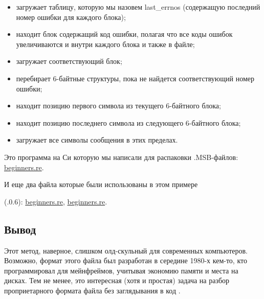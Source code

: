 \begin{itemize}
\item загружает таблицу, которую мы назовем last\_errnos 
(содержащую последний номер ошибки для каждого блока);

\item находит блок содержащий код ошибки, полагая что все коды ошибок увеличиваются и внутри каждого блока
и также в файле;

\item загружает соответствующий блок;

\item перебирает 6-байтные структуры, пока не найдется соответствующий номер ошибки;

\item находит позицию первого символа из текущего 6-байтного блока;

\item находит позицию последнего символа из следующего 6-байтного блока;

\item загружает все символы сообщения в этих пределах.
\end{itemize}

Это программа на Си которую мы написали для распаковки .MSB-файлов:
\href{http://beginners.re/examples/oracle/MSB/oracle_msb.c}{beginners.re}.

И еще два файла которые были использованы в этом примере
 
(.0.6):
\href{http://beginners.re/examples/oracle/MSB/oraus.msb}{beginners.re},
\href{http://beginners.re/examples/oracle/MSB/oraus.msg}{beginners.re}.

\subsection{Вывод}

Этот метод, наверное, слишком олд-скульный для современных компьютеров.
Возможно, формат этого файла был разработан в середине 1980-х кем-то, кто программировал для мейнфреймов,
учитывая экономию памяти и места на дисках.
Тем не менее, это интересная (хотя и простая) задача на разбор проприетарного формата файла без
заглядывания в код \oracle.

